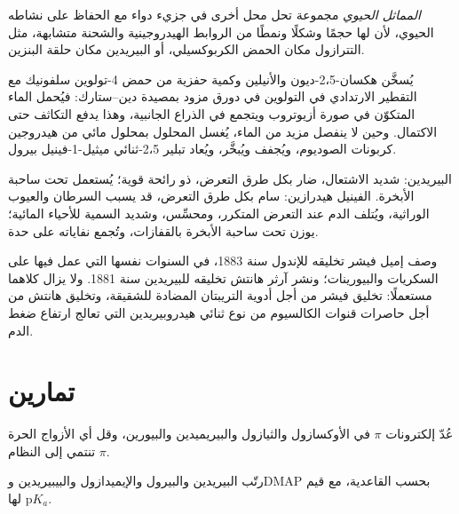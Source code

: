 \begin{definition}\label{def:b3:heterocycles:bioisostere}
\emph{المماثل الحيوي} مجموعة تحل محل أخرى في
جزيء دواء مع الحفاظ على نشاطه الحيوي، لأن لها حجمًا وشكلًا
ونمطًا من الروابط الهيدروجينية والشحنة متشابهة، مثل التترازول
مكان الحمض الكربوكسيلي، أو البيريدين مكان حلقة البنزين.
\end{definition}

\begin{inthelab}
يُسخَّن هكسان-2،5-ديون والأنيلين وكمية حفزية من حمض 4-تولوين سلفونيك
مع التقطير الارتدادي في التولوين في دورق مزود بمصيدة دين--ستارك: فيُحمل
الماء المتكوّن في صورة أزيوتروب ويتجمع في الذراع الجانبية، وهذا
يدفع التكاثف حتى الاكتمال. وحين لا ينفصل مزيد من الماء، يُغسل
المحلول بمحلول مائي من هيدروجين كربونات الصوديوم، ويُجفف ويُبخَّر،
ويُعاد تبلير 2،5-ثنائي ميثيل-1-فينيل بيرول.
\end{inthelab}

\begin{safety}{}
البيريدين: شديد الاشتعال، ضار بكل طرق التعرض، ذو رائحة قوية؛ يُستعمل تحت
ساحبة الأبخرة. الفينيل هيدرازين: سام بكل طرق التعرض، قد يسبب السرطان والعيوب
الوراثية، ويُتلف الدم عند التعرض المتكرر، ومحسِّس، وشديد السمية
للأحياء المائية؛ يوزن تحت ساحبة الأبخرة بالقفازات، وتُجمع نفاياته
على حدة.
\end{safety}

\begin{history}
وصف إميل فيشر تخليقه للإندول سنة 1883، في السنوات نفسها التي عمل فيها
على السكريات والبيورينات؛ ونشر آرثر هانتش تخليقه للبيريدين
سنة 1881. ولا يزال كلاهما مستعملًا: تخليق فيشر من أجل أدوية
التريبتان المضادة للشقيقة، وتخليق هانتش من أجل حاصرات قنوات الكالسيوم
من نوع ثنائي هيدروبيريدين التي تعالج ارتفاع ضغط الدم.
\end{history}

\section{تمارين}

\begin{exercise}[$\star$]\label{exo:b3:heterocycles:1}
عُدّ إلكترونات $\pi$ في الأوكسازول والثيازول والبيريميدين والبيورين، وقل أي
الأزواج الحرة تنتمي إلى النظام $\pi$.
\end{exercise}

\begin{exercise}[$\star$]\label{exo:b3:heterocycles:2}
رتّب البيريدين والبيرول والإيميدازول والبيبيريدين وDMAP بحسب القاعدية، مع
قيم $\mathrm pK_a$ لها.
\end{exercise}

